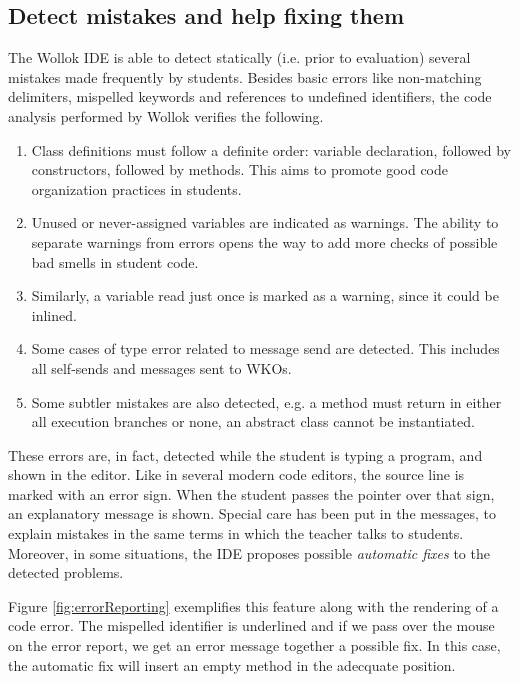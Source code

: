 \subsection{Detect mistakes and help fixing them}
\label{sec:detectMistakes}
The Wollok IDE is able to detect statically (i.e. prior to evaluation) several mistakes made frequently by students. Besides basic errors like non-matching delimiters, mispelled keywords and references to undefined identifiers, the code analysis performed by Wollok verifies the following.
\begin{enumerate}
\item 
Class definitions must follow a definite order: variable declaration, followed by constructors, followed by methods. This aims to promote good code organization practices in students.
\item 
Unused or never-assigned variables are indicated as warnings. The ability to separate warnings from errors opens the way to add more checks of possible bad smells in student code.
\item 
Similarly, a variable read just once is marked as a warning, since it could be inlined.
\item 
Some cases of type error related to message send are detected. This includes all self-sends and messages sent to WKOs.
\item 
Some subtler mistakes are also detected, e.g. a method must return in either all execution branches or none, an abstract class cannot be instantiated.
\end{enumerate}

These errors are, in fact, detected while the student is typing a program, and shown in the editor. Like in several modern code editors, the source line is marked with an error sign. When the student passes the pointer over that sign, an explanatory message is shown.
Special care has been put in the messages, to explain mistakes in the same terms in which the teacher talks to students.
Moreover, in some situations, the IDE proposes possible \emph{automatic fixes} to the detected problems.

Figure \ref{fig:errorReporting} exemplifies this feature along with the rendering of a code error. The mispelled identifier is underlined and if we pass over the mouse on the error report, we get an error message together a possible fix.
In this case, the automatic fix will insert an empty method in the adecquate position. 


